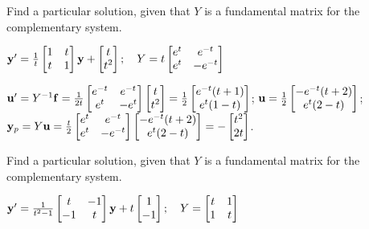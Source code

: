 \documentclass{ximera}
\begin{document}
 \begin{problem}\label{exer:10.7.12}
 Find a particular solution, given that $Y$ is a fundamental matrix for the complementary system.
 
$ {\bf y}'=\frac{1}{t}\begin{bmatrix}1&t\\t&1\end{bmatrix}{\bf y}
+\begin{bmatrix}
t\\t^2\end{bmatrix};  \quad Y=t\begin{bmatrix}
e^t&e^{-t}\\e^t&-e^{-t}
\end{bmatrix}$

\begin{solution}
    ${\bf u}'=Y^{-1}{\bf f}=
\frac{1}{2t}\begin{bmatrix}
e^{-t}&e^{-t}\\e^t&-e^t\end{bmatrix}
\begin{bmatrix}t\\t^2\end{bmatrix}=
\frac{1}{2}\begin{bmatrix}
e^{-t}(t+1)\\e^t(1-t)\end{bmatrix}$;
${\bf u}=
\frac{1}{2}\begin{bmatrix}
-e^{-t}(t+2)\\e^t(2-t)\end{bmatrix}$;
${\bf y}_p=Y{\bf u}=
\frac{t}{2}\begin{bmatrix}
e^t&e^{-t}\\e^t&-e^{-t}\end{bmatrix}
\begin{bmatrix}-e^{-t}(t+2)\\
e^t(2-t)\end{bmatrix}=
-\begin{bmatrix}t^2\\2t\end{bmatrix}$.
\end{solution}
\end{problem}

 \begin{problem}\label{exer:10.7.13}
 Find a particular solution, given that $Y$ is a fundamental matrix for the complementary system.
 
$ {\bf y}'=\frac{1}{t^2-1}\begin{bmatrix}t&-1\\-1&t\end{bmatrix}{\bf y}+
t\begin{bmatrix}
1\\-1\end{bmatrix};  \quad Y=\begin{bmatrix}
t&1\\1&t
\end{bmatrix}$
\end{problem}
\end{document}
